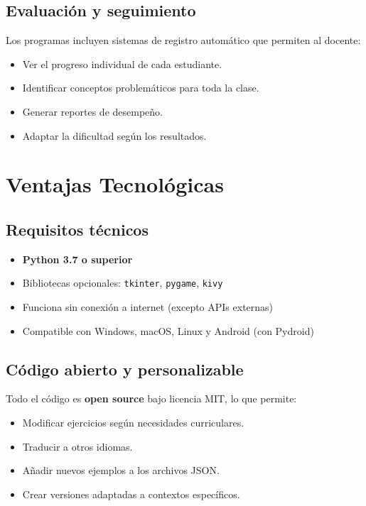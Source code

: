 \documentclass[12pt,spanish]{article}
\begin{document}
\subsection{Evaluación y seguimiento}

Los programas incluyen sistemas de registro automático que permiten al docente:

\begin{itemize}
    \item Ver el progreso individual de cada estudiante.
    \item Identificar conceptos problemáticos para toda la clase.
    \item Generar reportes de desempeño.
    \item Adaptar la dificultad según los resultados.
\end{itemize}

\section{Ventajas Tecnológicas}

\subsection{Requisitos técnicos}

\begin{itemize}
    \item \textbf{Python 3.7 o superior}
    \item Bibliotecas opcionales: \texttt{tkinter}, \texttt{pygame}, \texttt{kivy}
    \item Funciona sin conexión a internet (excepto APIs externas)
    \item Compatible con Windows, macOS, Linux y Android (con Pydroid)
\end{itemize}

\subsection{Código abierto y personalizable}

Todo el código es \textbf{open source} bajo licencia MIT, lo que permite:

\begin{itemize}
    \item Modificar ejercicios según necesidades curriculares.
    \item Traducir a otros idiomas.
    \item Añadir nuevos ejemplos a los archivos JSON.
    \item Crear versiones adaptadas a contextos específicos.
\end{itemize}
\end{document}
